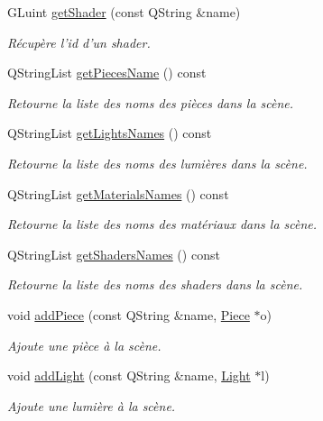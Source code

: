 \begin{DoxyCompactItemize}
G\+Luint \hyperlink{class_scene_a002dee3b17da628be382679c99d78c8f}{get\+Shader} (const Q\+String \&name)
\begin{DoxyCompactList}\small\item\em Récupère l'id d'un shader. \end{DoxyCompactList}\item 
Q\+String\+List \hyperlink{class_scene_a2ea5207a5d9ec6e4081f12896b01d9d5}{get\+Pieces\+Name} () const 
\begin{DoxyCompactList}\small\item\em Retourne la liste des noms des pièces dans la scène. \end{DoxyCompactList}\item 
Q\+String\+List \hyperlink{class_scene_a215d616b6132f30a6bfc66ea4a3cfb95}{get\+Lights\+Names} () const 
\begin{DoxyCompactList}\small\item\em Retourne la liste des noms des lumières dans la scène. \end{DoxyCompactList}\item 
Q\+String\+List \hyperlink{class_scene_a481bf791889936bf3521c849bc4c7c2f}{get\+Materials\+Names} () const 
\begin{DoxyCompactList}\small\item\em Retourne la liste des noms des matériaux dans la scène. \end{DoxyCompactList}\item 
Q\+String\+List \hyperlink{class_scene_ae8045c3444b367c070988b30d69e5a36}{get\+Shaders\+Names} () const 
\begin{DoxyCompactList}\small\item\em Retourne la liste des noms des shaders dans la scène. \end{DoxyCompactList}\item 
void \hyperlink{class_scene_a6c40a38ef472e73ddee697f813b8e587}{add\+Piece} (const Q\+String \&name, \hyperlink{class_piece}{Piece} $\ast$o)
\begin{DoxyCompactList}\small\item\em Ajoute une pièce à la scène. \end{DoxyCompactList}\item 
void \hyperlink{class_scene_aedf1b6729e0feda58666662c349ffed1}{add\+Light} (const Q\+String \&name, \hyperlink{class_light}{Light} $\ast$l)
\begin{DoxyCompactList}\small\item\em Ajoute une lumière à la scène. \end{DoxyCompactList}\item 

\end{DoxyCompactItemize}
